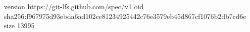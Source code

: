 version https://git-lfs.github.com/spec/v1
oid sha256:f967975d93ebda6ad102ce81234925442c76e3579eb45d867cf1076b2db7cd6e
size 13995
